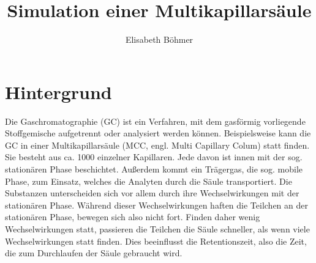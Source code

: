 \documentclass[a4paper,10pt]{article}
\title{Simulation einer Multikapillarsäule}%
\author{Elisabeth Böhmer}
\begin{document}
\maketitle

\section{Hintergrund}


Die Gaschromatographie (GC) ist ein Verfahren, mit dem gasförmig vorliegende Stoffgemische aufgetrennt oder analysiert werden können. 
Beispielsweise kann die GC in einer Multikapillarsäule (MCC, engl. Multi Capillary Colum) statt finden. Sie besteht aus ca. 1000 %
einzelner Kapillaren. Jede davon ist innen mit der sog. stationären Phase beschichtet. Außerdem kommt ein Trägergas, die sog. mobile Phase, zum Einsatz, welches die Analyten durch die Säule transportiert. Die Substanzen unterscheiden sich vor allem durch ihre Wechselwirkungen mit der stationären Phase. Während dieser Wechselwirkungen haften die Teilchen an der stationären Phase, bewegen sich also nicht fort. Finden daher wenig Wechselwirkungen statt, passieren die Teilchen die Säule schneller, als wenn viele Wechselwirkungen statt finden. Dies beeinflusst die Retentionszeit, also die Zeit, die zum Durchlaufen der Säule gebraucht wird.\cite{kolb2003}


\end{document}
